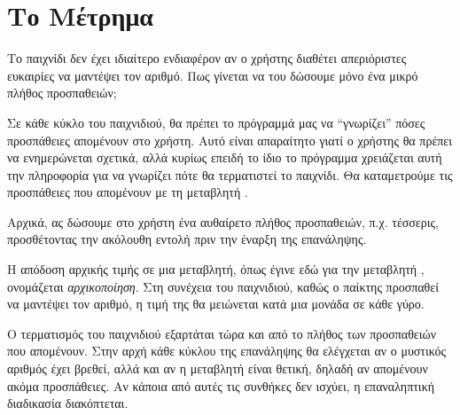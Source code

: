 \documentclass[a4paper,11pt,oneside]{book}
\begin{document}

\section{Το Μέτρημα}

\begin{question}
Το παιχνίδι δεν έχει ιδιαίτερο ενδιαφέρον αν ο χρήστης διαθέτει απεριόριστες ευκαιρίες
να μαντέψει τον αριθμό. Πως γίνεται να του δώσουμε μόνο ένα μικρό πλήθος προσπαθειών;
\end{question}

Σε κάθε κύκλο του παιχνιδιού, θα πρέπει το πρόγραμμά μας να ``γνωρίζει'' πόσες προσπάθειες απομένουν στο χρήστη. Αυτό είναι απαραίτητο γιατί ο χρήστης θα πρέπει να ενημερώνεται σχετικά, αλλά κυρίως επειδή το ίδιο το πρόγραμμα χρειάζεται αυτή την πληροφορία για να γνωρίζει πότε θα τερματιστεί το παιχνίδι. 
Θα καταμετρούμε τις προσπάθειες που απομένουν με τη μεταβλητή .

Αρχικά, ας δώσουμε στο χρήστη ένα αυθαίρετο πλήθος προσπαθειών, π.χ. τέσσερις, προσθέτοντας την ακόλουθη εντολή πριν την έναρξη της επανάληψης.


Η απόδοση αρχικής τιμής σε μια μεταβλητή, όπως έγινε εδώ για την μεταβλητή , ονομάζεται \emph{αρχικοποίηση}. Στη συνέχεια του παιχνιδιού, καθώς ο παίκτης προσπαθεί να μαντέψει τον αριθμό, η τιμή της  θα μειώνεται κατά μια μονάδα σε κάθε γύρο.%


Ο τερματισμός του παιχνιδιού εξαρτάται τώρα και από το πλήθος των προσπαθειών που απομένουν. Στην αρχή κάθε κύκλου της επανάληψης θα ελέγχεται αν ο μυστικός αριθμός έχει βρεθεί, αλλά και αν η μεταβλητή  είναι θετική, δηλαδή αν απομένουν ακόμα προσπάθειες. Αν κάποια από αυτές τις συνθήκες δεν ισχύει, η επαναληπτική διαδικασία διακόπτεται. 

\end{document}
